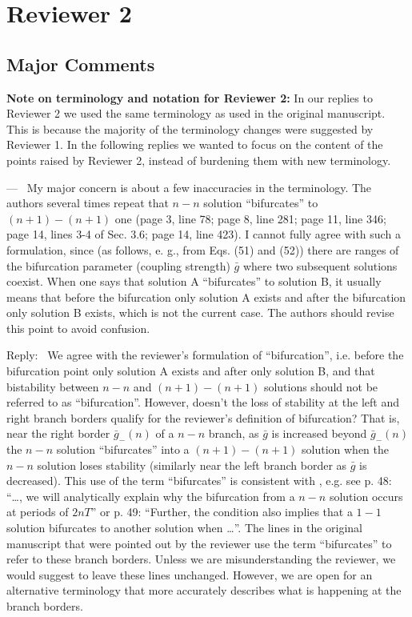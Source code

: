 \documentclass[utf8]{article}
\newcounter{point}[section]
\newenvironment{point}
{\refstepcounter{point} \bigskip \noindent {\textbf{Point~P\thesubsection.\arabic{point}} } ---\ }
{\par }
\newenvironment{reply}
{\medskip \noindent Reply:\  }
		{\medskip}
\begin{document}
\section{Reviewer 2}
\label{sec:r2}
\subsection{Major Comments}
\textbf{Note on terminology and notation for Reviewer 2:} In our replies to Reviewer 2 we used the same terminology as used in the original manuscript. This is because the majority of the terminology changes were suggested by Reviewer 1. In the following replies we wanted to focus on the content of the points raised by Reviewer 2, instead of burdening them with new terminology.
\setcounter{point}{0}

\begin{point}
My major concern is about a few inaccuracies in the terminology.
The authors several times repeat that $n - n$ solution ``bifurcates'' to $(n + 1) - (n + 1)$ one (page 3, line 78; page 8, line 281; page 11, line 346; page 14, lines 3-4 of Sec. 3.6; page 14, line 423).
I cannot fully agree with such a formulation, since (as follows, e. g., from Eqs. (51) and (52)) there are ranges of the bifurcation parameter (coupling strength) $\bar g$ where two subsequent solutions coexist.
When one says that solution A ``bifurcates'' to solution B, it usually means that before the bifurcation only solution A exists and after the bifurcation only solution B exists, which is not the current case.
The authors should revise this point to avoid confusion.
\end{point}

\begin{reply}
We agree with the reviewer's formulation of ``bifurcation'', i.e. before the bifurcation point only solution A exists and after only solution B, and that bistability between $n-n$ and $(n+1)-(n+1)$ solutions should not be referred to as ``bifurcation''.
However, doesn't the loss of stability at the left and right branch borders qualify for the reviewer's definition of bifurcation?
That is, near the right border $\bar g_{-}(n)$ of a $n-n$ branch, as $\bar g$ is increased beyond $\bar g_{-}(n)$ the $n-n$ solution ``bifurcates'' into a $(n+1)-(n+1)$ solution when the $n-n$ solution loses stability (similarly near the left branch border as $\bar g$ is decreased).
This use of the term ``bifurcates'' is consistent with \cite{bose2011}, e.g. see p. 48: ``\dots, we will analytically explain why the bifurcation from a $n-n$ solution occurs at periods of $2nT$'' or p. 49: ``Further, the condition also implies that a $1-1$ solution bifurcates to another solution when \dots''.
The lines in the original manuscript that were pointed out by the reviewer use the term ``bifurcates'' to refer to these branch borders.
Unless we are misunderstanding the reviewer, we would suggest to leave these lines unchanged.
However, we are open for an alternative terminology that more accurately describes what is happening at the branch borders.
\end{reply}
\end{document}
